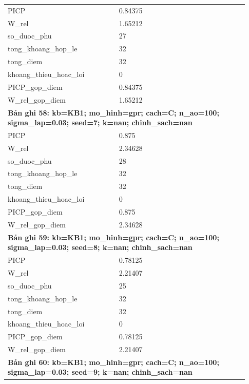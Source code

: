 \begin{longtable}{p{0.43\linewidth}p{0.50\linewidth}}
PICP & 0.84375 \\
W\_\allowbreak rel & 1.65212 \\
so\_\allowbreak duoc\_\allowbreak phu & 27 \\
tong\_\allowbreak khoang\_\allowbreak hop\_\allowbreak le & 32 \\
tong\_\allowbreak diem & 32 \\
khoang\_\allowbreak thieu\_\allowbreak hoac\_\allowbreak loi & 0 \\
PICP\_\allowbreak gop\_\allowbreak diem & 0.84375 \\
W\_\allowbreak rel\_\allowbreak gop\_\allowbreak diem & 1.65212 \\
\midrule
\multicolumn{2}{p{0.95\linewidth}}{\textbf{Bản ghi 58: kb=KB1; mo\_hinh=gpr; cach=C; n\_ao=100; sigma\_lap=0.03; seed=7; k=nan; chinh\_sach=nan}} \\
PICP & 0.875 \\
W\_\allowbreak rel & 2.34628 \\
so\_\allowbreak duoc\_\allowbreak phu & 28 \\
tong\_\allowbreak khoang\_\allowbreak hop\_\allowbreak le & 32 \\
tong\_\allowbreak diem & 32 \\
khoang\_\allowbreak thieu\_\allowbreak hoac\_\allowbreak loi & 0 \\
PICP\_\allowbreak gop\_\allowbreak diem & 0.875 \\
W\_\allowbreak rel\_\allowbreak gop\_\allowbreak diem & 2.34628 \\
\midrule
\multicolumn{2}{p{0.95\linewidth}}{\textbf{Bản ghi 59: kb=KB1; mo\_hinh=gpr; cach=C; n\_ao=100; sigma\_lap=0.03; seed=8; k=nan; chinh\_sach=nan}} \\
PICP & 0.78125 \\
W\_\allowbreak rel & 2.21407 \\
so\_\allowbreak duoc\_\allowbreak phu & 25 \\
tong\_\allowbreak khoang\_\allowbreak hop\_\allowbreak le & 32 \\
tong\_\allowbreak diem & 32 \\
khoang\_\allowbreak thieu\_\allowbreak hoac\_\allowbreak loi & 0 \\
PICP\_\allowbreak gop\_\allowbreak diem & 0.78125 \\
W\_\allowbreak rel\_\allowbreak gop\_\allowbreak diem & 2.21407 \\
\midrule
\multicolumn{2}{p{0.95\linewidth}}{\textbf{Bản ghi 60: kb=KB1; mo\_hinh=gpr; cach=C; n\_ao=100; sigma\_lap=0.03; seed=9; k=nan; chinh\_sach=nan}} \\

\end{longtable}
